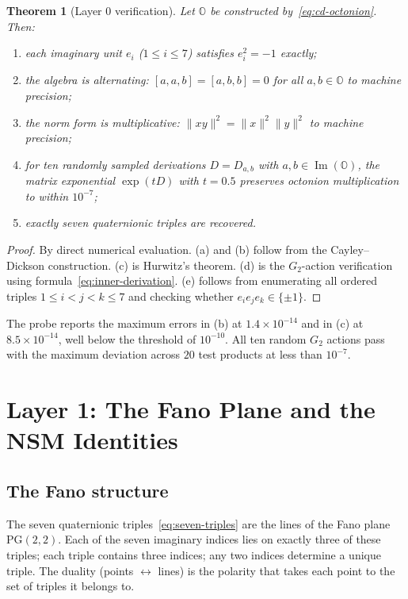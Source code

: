 \documentclass[11pt,a4paper]{article}
\theoremstyle{plain}
\newtheorem{theorem}{Theorem}[section]
\theoremstyle{definition}
\theoremstyle{remark}
\numberwithin{equation}{section}
\providecommand{\OO}{\mathbb{O}}
\providecommand{\PG}{\mathrm{PG}}
\DeclareMathOperator{\Img}{Im}
\begin{document}
\begin{theorem}[Layer 0 verification]\label{thm:layer0}
Let $\OO$ be constructed by~\eqref{eq:cd-octonion}.  Then:
\begin{enumerate}[label=(\alph*)]
\item each imaginary unit $e_i$ ($1 \leq i \leq 7$) satisfies
      $e_i^2 = -1$ exactly;
\item the algebra is alternating: $[a, a, b] = [a, b, b] = 0$ for
      all $a, b \in \OO$ to machine precision;
\item the norm form is multiplicative: $\|xy\|^2 = \|x\|^2 \|y\|^2$
      to machine precision;
\item for ten randomly sampled derivations $D = D_{a,b}$ with
      $a, b \in \Img(\OO)$, the matrix exponential $\exp(t D)$ with
      $t = 0.5$ preserves octonion multiplication to within
      $10^{-7}$;
\item exactly seven quaternionic triples are recovered.
\end{enumerate}
\end{theorem}

\begin{proof}
By direct numerical evaluation.  (a) and (b) follow from the
Cayley--Dickson construction.  (c) is Hurwitz's theorem.  (d) is
the $G_2$-action verification using
formula~\eqref{eq:inner-derivation}.  (e) follows from enumerating
all ordered triples $1 \leq i < j < k \leq 7$ and checking
whether $e_i e_j e_k \in \{\pm 1\}$.
\end{proof}

The probe reports the maximum errors in (b) at $1.4 \times 10^{-14}$
and in (c) at $8.5 \times 10^{-14}$, well below the threshold of
$10^{-10}$.  All ten random $G_2$ actions pass with the maximum
deviation across $20$ test products at less than $10^{-7}$.


\section{Layer 1: The Fano Plane and the NSM Identities}\label{sec:layer1}

\subsection{The Fano structure}

The seven quaternionic triples~\eqref{eq:seven-triples} are the
lines of the Fano plane $\PG(2,2)$.  Each of the seven imaginary
indices lies on exactly three of these triples; each triple
contains three indices; any two indices determine a unique triple.
The duality (points $\leftrightarrow$ lines) is the polarity that
takes each point to the set of triples it belongs to.
\end{document}
